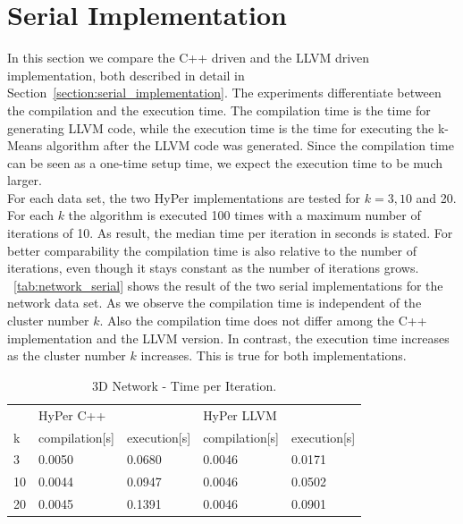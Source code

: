 \section{Serial Implementation}\label{section:serial}

In this section we compare the C++ driven and the LLVM driven implementation, both described in detail in Section~\ref{section:serial_implementation}. The experiments differentiate between the compilation and the execution time. The compilation time is the time for generating LLVM code, while the execution time is the time for executing the k-Means algorithm after the LLVM code was generated. Since the compilation time can be seen as a one-time setup time, we expect the execution time to be much larger. 
\\
For each data set, the two HyPer implementations are tested for $k = 3,10$ and 20. For each $k$ the algorithm is executed 100 times with a maximum number of iterations of 10. As result, the median time per iteration in seconds is stated. For better comparability the compilation time is also relative to the number of iterations, even though it stays constant as the number of iterations grows.
\\
~\autoref{tab:network_serial} shows the result of the two serial implementations for the network data set. As we observe the compilation time is independent of the cluster number $k$. Also the compilation time does not differ among the C++ implementation and the LLVM version. In contrast, the execution time increases as the cluster number $k$ increases. This is true for both implementations. 

\begin{table}[htsb]
  \caption[3D Network - Time per Iteration (Serial)]{3D Network - Time per Iteration.}\label{tab:network_serial}
  \centering
  \begin{tabular}{l l l l l}
    \toprule
      & HyPer C++ & & HyPer LLVM & \\
      k & compilation[s] & execution[s] & compilation[s] & execution[s] \\
    \midrule
      3 & 0.0050 & 0.0680 & 0.0046 & 0.0171 \\
      10 & 0.0044 & 0.0947 & 0.0046 & 0.0502 \\
      20 & 0.0045 & 0.1391 & 0.0046 & 0.0901 \\
    \bottomrule
  \end{tabular}
\end{table}


